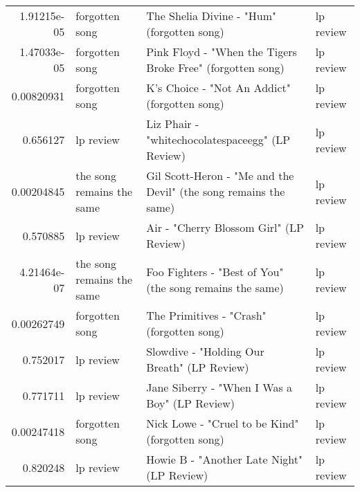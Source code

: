 \documentclass[letterpaper,10pt]{article}
\begin{document}
\begin{table}[H]
\begin{adjustbox}{max width=\linewidth}
\begin{tabular}{rlll}
  1.91215e-05 & forgotten song            & The Shelia Divine - "Hum" (forgotten song)                                                                   & lp review                 \\
  1.47033e-05 & forgotten song            & Pink Floyd - "When the Tigers Broke Free" (forgotten song)                                                   & lp review                 \\
  0.00820931  & forgotten song            & K's Choice - "Not An Addict" (forgotten song)                                                                & lp review                 \\
  0.656127    & lp review                 & Liz Phair - "whitechocolatespaceegg" (LP Review)                                                             & lp review                 \\
  0.00204845  & the song remains the same & Gil Scott-Heron - "Me and the Devil" (the song remains the same)                                             & lp review                 \\
  0.570885    & lp review                 & Air - "Cherry Blossom Girl" (LP Review)                                                                      & lp review                 \\
  4.21464e-07 & the song remains the same & Foo Fighters - "Best of You" (the song remains the same)                                                     & lp review                 \\
  0.00262749  & forgotten song            & The Primitives - "Crash" (forgotten song)                                                                    & lp review                 \\
  0.752017    & lp review                 & Slowdive - "Holding Our Breath" (LP Review)                                                                  & lp review                 \\
  0.771711    & lp review                 & Jane Siberry - "When I Was a Boy" (LP Review)                                                                & lp review                 \\
  0.00247418  & forgotten song            & Nick Lowe - "Cruel to be Kind" (forgotten song)                                                              & lp review                 \\
  0.820248    & lp review                 & Howie B - "Another Late Night" (LP Review)                                                                   & lp review                 \\

\end{tabular}
\end{adjustbox}
\end{table}
\end{document}
